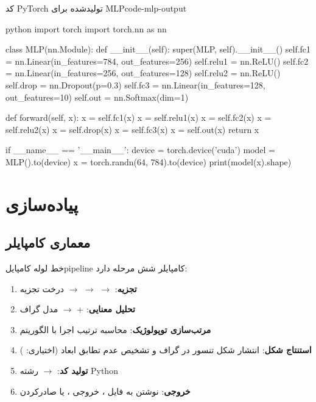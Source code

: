 \documentclass{nngraph-fa}
\begin{document}
\begin{codebox}{کد PyTorch تولیدشده برای MLP}{code-mlp-output}
\begin{amzcode}{python}
import torch
import torch.nn as nn


class MLP(nn.Module):
    def __init__(self):
        super(MLP, self).__init__()
        self.fc1   = nn.Linear(in_features=784, out_features=256)
        self.relu1 = nn.ReLU()
        self.fc2   = nn.Linear(in_features=256, out_features=128)
        self.relu2 = nn.ReLU()
        self.drop  = nn.Dropout(p=0.3)
        self.fc3   = nn.Linear(in_features=128, out_features=10)
        self.out   = nn.Softmax(dim=1)

    def forward(self, x):
        x = self.fc1(x)
        x = self.relu1(x)
        x = self.fc2(x)
        x = self.relu2(x)
        x = self.drop(x)
        x = self.fc3(x)
        x = self.out(x)
        return x


if __name__ == '__main__':
    device = torch.device('cuda')
    model  = MLP().to(device)
    x      = torch.randn(64, 784).to(device)
    print(model(x).shape)
\end{amzcode}
\end{codebox}

\chapter{پیاده‌سازی}

\section{معماری کامپایلر}

\begin{dfnbox}{خط لوله کامپایل}{pipeline}
کامپایلر شش مرحله دارد:
\begin{enumerate}
    \item \textbf{تجزیه}:  $\to$ 
    $\to$  $\to$ درخت تجزیه
    \item \textbf{تحلیل معنایی}:  +
     $\to$ مدل گراف
    \item \textbf{مرتب‌سازی توپولوژیک}: محاسبه ترتیب اجرا با الگوریتم
    \item \textbf{استنتاج شکل}: انتشار شکل تنسور در گراف و تشخیص
    عدم تطابق ابعاد (اختیاری: )
    \item \textbf{تولید کد}:  $\to$
    رشته Python
    \item \textbf{خروجی}: نوشتن به فایل ، خروجی
    ، یا صادرکردن 
\end{enumerate}
\end{dfnbox}
\end{document}
